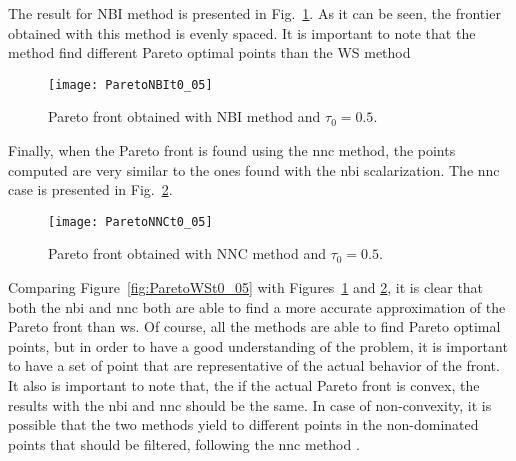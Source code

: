 The result for NBI method is presented in Fig.~\ref{fig:ParetoNBIt0_05}. As it can be seen, the frontier obtained with this method is evenly spaced. It is important to note that the method find different Pareto optimal points than the WS method
%
\begin{figure}[tb]%
\centering
\texttt{[image: ParetoNBIt0\_05]}%
\caption{Pareto front obtained with NBI method and $\tau_0=0.5$.}%
\label{fig:ParetoNBIt0_05}%
\end{figure}
%

Finally, when the Pareto front is found using the \gls{nnc} method, the points computed are very similar to the ones found with the \gls{nbi} scalarization. The \gls{nnc} case is presented in Fig.~\ref{fig:ParetoNNCt0_05}. 
%
\begin{figure}[tb]%
	\centering
	\texttt{[image: ParetoNNCt0\_05]}%
	\caption{Pareto front obtained with NNC method and $\tau_0=0.5$.}%
	\label{fig:ParetoNNCt0_05}%
\end{figure}
%
Comparing Figure~\ref{fig:ParetoWSt0_05} with Figures~\ref{fig:ParetoNBIt0_05} and \ref{fig:ParetoNNCt0_05}, it is clear that both the \gls{nbi} and \gls{nnc} both are able to find a more accurate approximation of the Pareto front than \gls{ws}. Of course, all the methods are able to find Pareto optimal points, but in order to have a good understanding of the problem, it is important to have a set of point that are representative of the actual behavior of the front. It also is important to note that, the if the actual Pareto front is convex, the results with the \gls{nbi} and \gls{nnc} should be the same. In case of non-convexity, it is possible that the two methods yield to different points in the non-dominated points that should be filtered, following the \gls{nnc} method \cite{Messac2003}.
%
%
%

